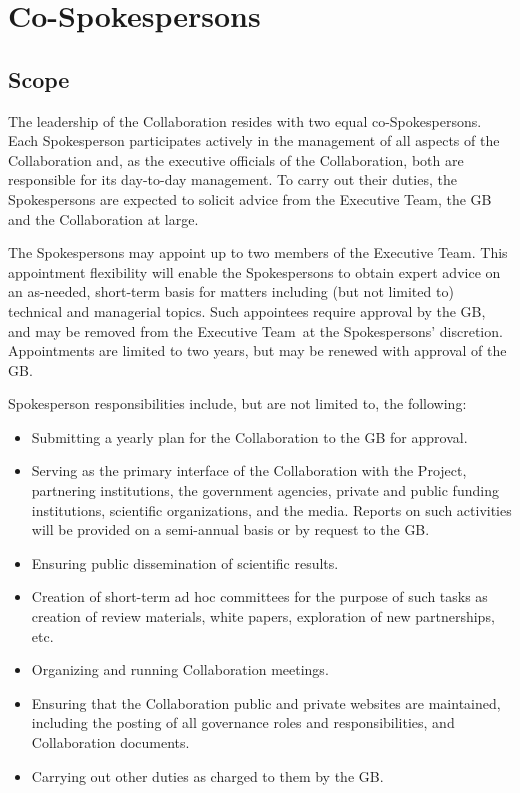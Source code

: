 \documentclass[12pt]{article}
\newcommand{\exec}{{Executive Team}}
\begin{document}
\section{Co-Spokespersons}
\label{sec:spokes}

\subsection{Scope}

The leadership of the Collaboration resides with two equal co-Spokespersons. Each Spokesperson participates actively in the management of all aspects of the Collaboration and, as the executive officials of the Collaboration, both  are responsible for its day-to-day management. To carry out their duties, the Spokespersons are expected to solicit advice from the \exec, the GB and the Collaboration at large.   

The Spokespersons may appoint up to two members of the \exec. This appointment flexibility will enable the Spokespersons to obtain expert advice on an as-needed, short-term basis for matters including (but not limited to) technical and managerial topics.
Such appointees require approval by the GB, and may be removed from the \exec\ at the Spokespersons' discretion.  Appointments are limited to two years, but may be renewed with approval of the GB. 

Spokesperson responsibilities include, but are not limited to, the following: 
\begin{itemize}
\item Submitting a yearly plan for the Collaboration to the GB for approval. 
\item Serving as the primary interface of the Collaboration with the Project, partnering institutions, the government agencies, private and public funding institutions, scientific organizations, and the media. Reports on such activities will be provided on a semi-annual basis or by request to the GB.
\item Ensuring public dissemination of scientific results. 
\item Creation of short-term ad hoc committees for the purpose of such tasks as creation of review materials, white papers, exploration of new partnerships, etc.
\item Organizing and running Collaboration meetings. 
\item Ensuring that the Collaboration public and private websites are maintained, including the posting of all governance roles and responsibilities, and Collaboration documents. 
\item Carrying out other duties as charged to them by the GB. 
\end{itemize}
\end{document}
